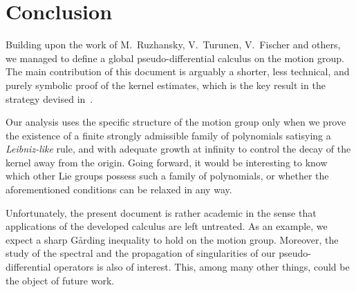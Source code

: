 \chapter{Conclusion}

Building upon the work of M.~Ruzhansky, V.~Turunen, V.~Fischer and others,
we managed to define a global pseudo-differential calculus on the motion group.
The main contribution of this document is arguably a shorter, less technical, and purely symbolic proof of the kernel estimates,
which is the key result in the strategy devised in~\cite{FischerRuzhansky16}.

Our analysis uses the specific structure of the motion group
only when we prove the existence of a finite strongly admissible family of polynomials satisying a \emph{Leibniz-like} rule,
and with adequate growth at infinity to control the decay of the kernel away from the origin.
Going forward,
it would be interesting to know which other Lie groups possess such a family of polynomials,
or whether the aforementioned conditions can be relaxed in any way.

Unfortunately,
the present document is rather academic
in the sense that applications of the developed calculus are left untreated.
As an example,
we expect a sharp Gårding inequality to hold on the motion group.
Moreover,
the study of the spectral and the propagation of singularities of our pseudo-differential operators is also of interest.
This, among many other things,
could be the object of future work.
